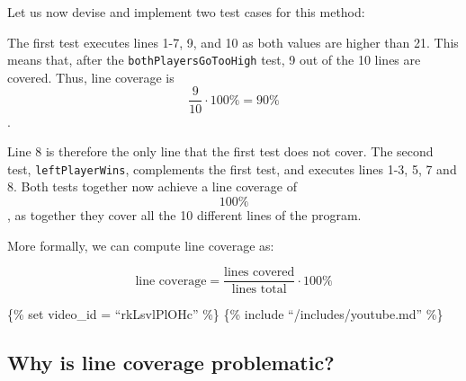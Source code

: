 Let us now devise and implement two test cases for this method:

\begin{Shaded}
\begin{Highlighting}[]
 
   \NormalTok{() \{}
     \NormalTok{(}\NormalTok{, }\NormalTok{);}
    \NormalTok{(}\NormalTok{);}
\NormalTok{  \}}

   \NormalTok{() \{}
     \NormalTok{(}\NormalTok{, }\NormalTok{);}
    \NormalTok{(}\NormalTok{);}
\NormalTok{  \}}
\NormalTok{\}}
\end{Highlighting}
\end{Shaded}

The first test executes lines 1-7, 9, and 10 as both values are higher
than 21. This means that, after the \texttt{bothPlayersGoTooHigh} test,
9 out of the 10 lines are covered. Thus, line coverage is
\[\frac{9}{10}\cdot100\% = 90\%\].

Line 8 is therefore the only line that the first test does not cover.
The second test, \texttt{leftPlayerWins}, complements the first test,
and executes lines 1-3, 5, 7 and 8. Both tests together now achieve a
line coverage of \[100\%\], as together they cover all the 10 different
lines of the program.

More formally, we can compute line coverage as:

\[\text{line coverage} = \frac{\text{lines covered}}{\text{lines total}} \cdot 100\%\]

\{\% set video\_id = ``rkLsvlPlOHc'' \%\} \{\% include
``/includes/youtube.md'' \%\}

\hypertarget{why-is-line-coverage-problematic}{%
\subsection{Why is line coverage
problematic?}\label{why-is-line-coverage-problematic}}

